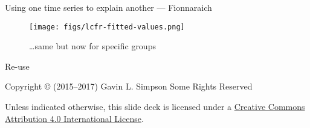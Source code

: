 \documentclass[11pt,ignorenonframetext,compress, aspectratio=169]{beamer}
\begin{document}
\begin{frame}{Using one time series to explain another --- Fionnaraich}

\begin{figure}[htbp]
\centering
\texttt{[image: figs/lcfr-fitted-values.png]}
\caption{\ldots{}same but now for specific groups}
\end{figure}

\end{frame}

\begin{frame}{Re-use}

Copyright © (2015--2017) Gavin L. Simpson Some Rights Reserved

Unless indicated otherwise, this slide deck is licensed under a
\href{http://creativecommons.org/licenses/by/4.0/}{Creative Commons
Attribution 4.0 International License}.

\begin{center}
  \ccby
\end{center}

\end{frame}
\end{document}
